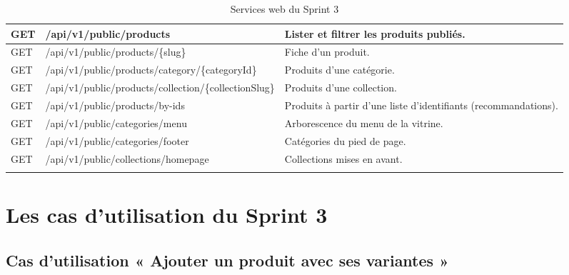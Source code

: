 \begin{longtable}{|p{1.5cm}|p{6.8cm}|p{6.2cm}|}
\hline
GET & /api/v1/public/products & Lister et filtrer les produits publiés. \\
\hline
GET & /api/v1/public/products/\{slug\} & Fiche d'un produit. \\
\hline
GET & /api/v1/public/products/category/\{categoryId\} & Produits d'une catégorie. \\
\hline
GET & /api/v1/public/products/collection/\{collectionSlug\} & Produits d'une collection. \\
\hline
GET & /api/v1/public/products/by-ids & Produits à partir d'une liste d'identifiants (recommandations). \\
\hline
GET & /api/v1/public/categories/menu & Arborescence du menu de la vitrine. \\
\hline
GET & /api/v1/public/categories/footer & Catégories du pied de page. \\
\hline
GET & /api/v1/public/collections/homepage & Collections mises en avant. \\
\hline
\caption{Services web du Sprint 3}
\label{tab:ws-sprint3}
\end{longtable}

\section{Les cas d'utilisation du Sprint 3}
\subsection{Cas d'utilisation « Ajouter un produit avec ses variantes »}
